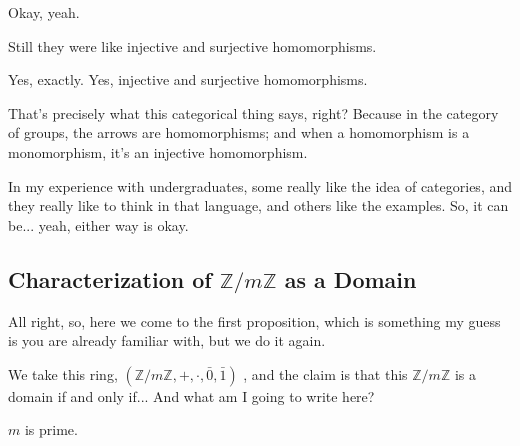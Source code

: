 \begin{speech}[00:14:54 - 00:14:57]
Okay, yeah.
\end{speech}

\begin{student}
Still they were like injective and surjective homomorphisms.
\end{student}

\begin{speech}[00:15:02 - 00:15:33]
Yes, exactly. Yes, injective and surjective homomorphisms.

That's precisely what this categorical thing says, right? Because in the category of groups, the arrows are homomorphisms; and when a homomorphism is a monomorphism, it's an injective homomorphism.

In my experience with undergraduates, some really like the idea of categories, and they really like to think in that language, and others like the examples. So, it can be... yeah, either way is okay.
\end{speech}

\subsection{\texorpdfstring{Characterization of $\mathbb{Z}/m\mathbb{Z}$ as a Domain}{Characterization of Z/mZ as a Domain}}

\begin{speech}[00:15:33 - 00:16:03]
All right, so, here we come to the first proposition, which is something my guess is you are already familiar with, but we do it again.

We take this ring, $(\mathbb{Z} / m\mathbb{Z}, +, \cdot, \bar{0}, \bar{1})$ , and the claim is that this $\mathbb{Z} / m\mathbb{Z}$ is a domain if and only if... And what am I going to write here?
\end{speech}

\begin{student}
$m$ is prime.
\end{student}

